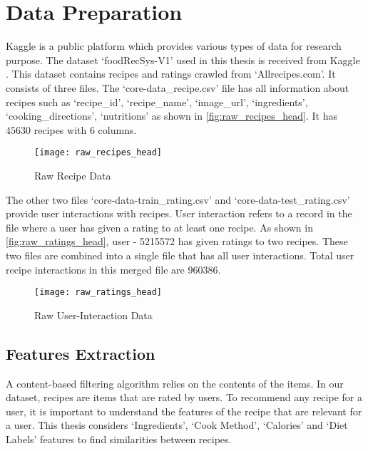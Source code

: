 
\section{Data Preparation}
\label{sec:data_prep}
Kaggle is a public platform which provides various types of data for research purpose. The dataset `foodRecSys-V1' used in this thesis is received from Kaggle \cite{48}. This dataset contains recipes and ratings crawled from `Allrecipes.com'. It consists of three files. The `core-data\_recipe.csv' file has all information about recipes such as `recipe\_id', `recipe\_name', `image\_url', `ingredients', `cooking\_directions', `nutritions' as shown in \autoref{fig:raw_recipes_head}. It has $45630$ recipes with $6$ columns.
\begin{singlespace}
\begin{figure}[H]
	\centering
	\texttt{[image: raw\_recipes\_head]}
	\caption{Raw Recipe Data}
	\label{fig:raw_recipes_head}
\end{figure}
\end{singlespace}

\noindent The other two files `core-data-train\_rating.csv' and `core-data-test\_rating.csv' provide user interactions with recipes. User interaction refers to a record in the file where a user has given a rating to at least one recipe. As shown in \autoref{fig:raw_ratings_head}, user - 5215572 has given ratings to two recipes. These two files are combined into a single file that has all user interactions.  Total user recipe interactions in this merged file are $960386$. 

\begin{singlespace}
\begin{figure}[H]
	\centering
	\texttt{[image: raw\_ratings\_head]}
	\caption{Raw User-Interaction Data}
	\label{fig:raw_ratings_head}
\end{figure}
\end{singlespace}

\subsection{Features Extraction}
A content-based filtering algorithm relies on the contents of the items. In our dataset, recipes are items that are rated by users. To recommend any recipe for a user, it is important to understand the features of the recipe that are relevant for a user. This thesis considers  `Ingredients', `Cook Method', `Calories' and `Diet Labels' features to find similarities between recipes.

